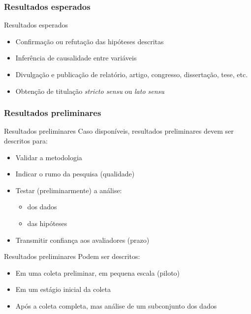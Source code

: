 \documentclass{beamer}
\begin{document}
\subsubsection{Resultados esperados}

\begin{frame}{Resultados esperados}
  \begin{itemize}
    \footnotesize
  \item Confirmação ou refutação das hipóteses descritas
  \bigskip
  \item Inferência de causalidade entre variáveis
  \bigskip
  \item Divulgação e publicação de relatório, artigo, congresso,
    dissertação, tese, etc.
  \bigskip
  \item Obtenção de titulação {\em stricto sensu} ou {\em lato sensu}
  \end{itemize}
\end{frame}

\subsubsection{Resultados preliminares}

\begin{frame}{Resultados preliminares}
  \scriptsize
  Caso disponíveis, resultados preliminares devem ser descritos para:
  \bigskip
  \begin{itemize}
    \footnotesize
  \item Validar a metodologia
  \bigskip
  \item Indicar o rumo da pesquisa (qualidade)
  \bigskip
  \item Testar (preliminarmente) a análise:
    \begin{itemize}
      \scriptsize
    \item dos dados
    \item das hipóteses
    \end{itemize}
  \bigskip
  \item Transmitir confiança aos avaliadores (prazo)
  \end{itemize}
\end{frame}

\begin{frame}{Resultados preliminares}
  \scriptsize
  Podem ser descritos:
  \bigskip
  \begin{itemize}
    \footnotesize
  \item Em uma coleta preliminar, em pequena escala (piloto)
  \bigskip
  \item Em um estágio inicial da coleta
  \bigskip
  \item Após a coleta completa, mas análise de um subconjunto dos dados
  \end{itemize}
\end{frame}
\end{document}
